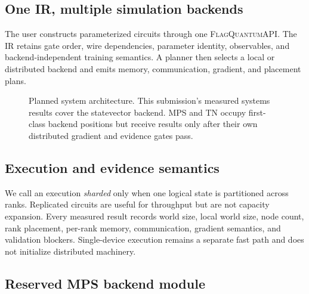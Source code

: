 \documentclass[10pt,twocolumn]{article}
\newcommand{\system}{\textsc{FlagQuantum}}
\begin{document}
\subsection{One IR, multiple simulation backends}

The user constructs parameterized circuits through one \system API.  The IR
retains gate order, wire dependencies, parameter identity, observables, and
backend-independent training semantics.  A planner then selects a local or
distributed backend and emits memory, communication, gradient, and placement
plans.

\begin{figure}[t]
  \centering
  \caption{Planned system architecture.  This submission's measured systems
  results cover the statevector backend.  MPS and TN occupy first-class
  backend positions but receive results only after their own distributed
  gradient and evidence gates pass.}
  \label{fig:architecture}
\end{figure}

\subsection{Execution and evidence semantics}

We call an execution \emph{sharded} only when one logical state is partitioned
across ranks.  Replicated circuits are useful for throughput but are not
capacity expansion.  Every measured result records world size, local world
size, node count, rank placement, per-rank memory, communication, gradient
semantics, and validation blockers.  Single-device execution remains a
separate fast path and does not initialize distributed machinery.

\subsection{Reserved MPS backend module}
\label{sec:mps-placeholder}
\end{document}
